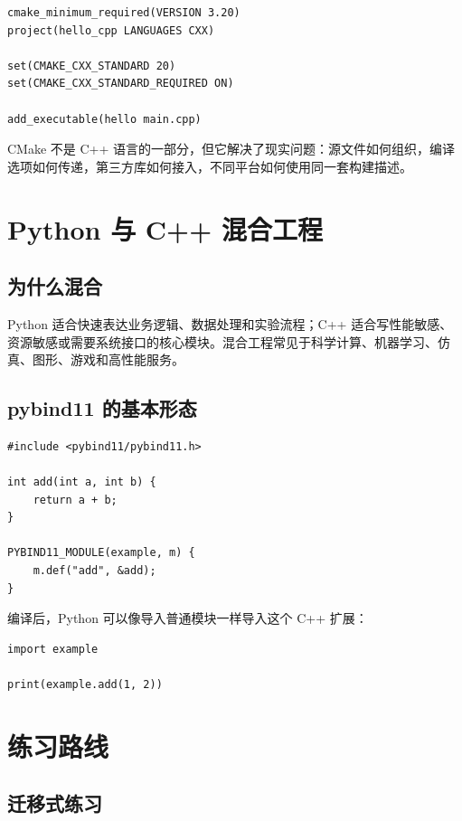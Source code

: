 \documentclass[UTF8,openany]{ctexbook}
\begin{document}
\begin{lstlisting}
cmake_minimum_required(VERSION 3.20)
project(hello_cpp LANGUAGES CXX)

set(CMAKE_CXX_STANDARD 20)
set(CMAKE_CXX_STANDARD_REQUIRED ON)

add_executable(hello main.cpp)
\end{lstlisting}

CMake 不是 C++ 语言的一部分，但它解决了现实问题：源文件如何组织，编译选项如何传递，第三方库如何接入，不同平台如何使用同一套构建描述。

\chapter{Python 与 C++ 混合工程}

\section{为什么混合}

Python 适合快速表达业务逻辑、数据处理和实验流程；C++ 适合写性能敏感、资源敏感或需要系统接口的核心模块。混合工程常见于科学计算、机器学习、仿真、图形、游戏和高性能服务。

\section{pybind11 的基本形态}

\begin{lstlisting}[style=cppstyle]
#include <pybind11/pybind11.h>

int add(int a, int b) {
    return a + b;
}

PYBIND11_MODULE(example, m) {
    m.def("add", &add);
}
\end{lstlisting}

编译后，Python 可以像导入普通模块一样导入这个 C++ 扩展：

\begin{lstlisting}[style=pythonstyle]
import example

print(example.add(1, 2))
\end{lstlisting}

\chapter{练习路线}

\section{迁移式练习}
\end{document}
